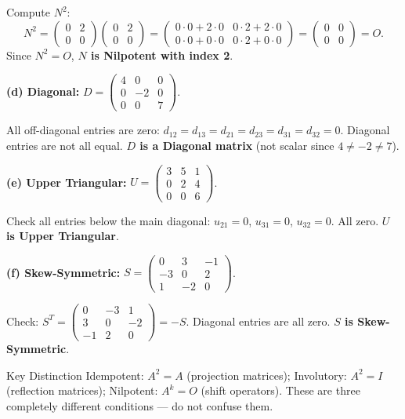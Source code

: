 \documentclass[12pt,a4paper]{article}
\begin{document}
Compute $N^2$:
\[
N^2 = \begin{pmatrix} 0 & 2 \\ 0 & 0 \end{pmatrix}\begin{pmatrix} 0 & 2 \\ 0 & 0 \end{pmatrix} = \begin{pmatrix} 0\cdot0+2\cdot0 & 0\cdot2+2\cdot0 \\ 0\cdot0+0\cdot0 & 0\cdot2+0\cdot0 \end{pmatrix} = \begin{pmatrix} 0 & 0 \\ 0 & 0 \end{pmatrix} = O.
\]
Since $N^2 = O$, \textbf{$N$ is Nilpotent with index 2}.

\medskip
\textbf{(d) Diagonal:} $D = \begin{pmatrix} 4 & 0 & 0 \\ 0 & -2 & 0 \\ 0 & 0 & 7 \end{pmatrix}$.

All off-diagonal entries are zero: $d_{12}=d_{13}=d_{21}=d_{23}=d_{31}=d_{32}=0$. Diagonal entries are not all equal. \textbf{$D$ is a Diagonal matrix} (not scalar since $4 \neq -2 \neq 7$).

\medskip
\textbf{(e) Upper Triangular:} $U = \begin{pmatrix} 3 & 5 & 1 \\ 0 & 2 & 4 \\ 0 & 0 & 6 \end{pmatrix}$.

Check all entries below the main diagonal: $u_{21}=0$, $u_{31}=0$, $u_{32}=0$. All zero. \textbf{$U$ is Upper Triangular}.

\medskip
\textbf{(f) Skew-Symmetric:} $S = \begin{pmatrix} 0 & 3 & -1 \\ -3 & 0 & 2 \\ 1 & -2 & 0 \end{pmatrix}$.

Check: $S^T = \begin{pmatrix} 0 & -3 & 1 \\ 3 & 0 & -2 \\ -1 & 2 & 0 \end{pmatrix} = -S$. Diagonal entries are all zero. \textbf{$S$ is Skew-Symmetric}.

\begin{learnbox}{Key Distinction}
Idempotent: $A^2 = A$ (projection matrices); Involutory: $A^2 = I$ (reflection matrices); Nilpotent: $A^k = O$ (shift operators). These are three completely different conditions --- do not confuse them.
\end{learnbox}
\end{document}
